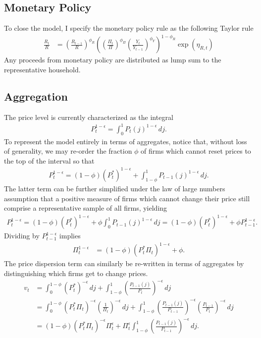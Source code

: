 \documentclass[12 pt, oneside]{article}
\theoremstyle{definition}
\theoremstyle{definition}
\theoremstyle{definition}
\begin{document}
\subsection{Monetary Policy}
To close the model, I specify the monetary policy rule as the following Taylor rule
\begin{align}\label{eq:taylor rule}
  \frac{R_t}{R} & =  \left(\frac{R_{t - 1}}{R}\right)^{\phi_R}\left(\left(\frac{\Pi_t}{\Pi}\right)^{\phi_\Pi}\left(\frac{Y_t}{Y_{t - 1}}\right)^{\phi_Y}\right)^{1 - \phi_R}\exp(\eta_{R, t})
\end{align}
Any proceeds from monetary policy are distributed as lump sum to the representative household.

\subsection{Aggregation}
The price level is currently characterized as the integral
\begin{align*}
  P_t^{1 - \epsilon} = \int_0^1 P_t(j)^{1 - \epsilon}\, dj.
\end{align*}
To represent the model entirely in terms of aggregates, notice that, without loss of generality, we may re-order the fraction $\phi$ of firms which cannot reset prices to the top of the interval so that
\begin{align*}
  P_t^{1 - \epsilon} = (1 - \phi)(P_t^*)^{1 - \epsilon} +  \int_{1 - \phi}^1 P_{t - 1}(j)^{1 - \epsilon}\, dj.
\end{align*}
The latter term can be further simplified under the law of large numbers assumption that a positive measure of firms which cannot change their price
still comprise a representative sample of all firms, yielding
\begin{align*}
  P_t^{1 - \epsilon} = (1 - \phi)(P_t^*)^{1 - \epsilon} +  \phi\int_0^1 P_{t - 1}(j)^{1 - \epsilon}\, dj = (1 - \phi)(P_t^*)^{1 - \epsilon} +  \phi P_{t - 1}^{1 - \epsilon}.
\end{align*}
Dividing by $P_{t - 1}^{1 - \epsilon}$ implies
\begin{align}\label{eq:inflation from optimal reset price}
  \Pi_t^{ 1 - \epsilon} & = (1 - \phi) (P_t^*\Pi_t)^{1 - \epsilon} + \phi.
\end{align}
The price dispersion term can similarly be re-written in terms of aggregates by distinguishing which firms get to change prices.
\begin{align*}
  v_t & = \int_0^{1 - \phi}\left(P_t^*\right)^{ - \epsilon}\, dj + \int_{1 - \phi}^1 \left(\frac{P_{t - 1}(j)}{P_t}\right)^{ - \epsilon}\, dj\\
      & = \int_0^{1 - \phi}\left(P_t^*\Pi_t\right)^{ - \epsilon}\left(\frac{1}{\Pi_t}\right)^{ - \epsilon}\, dj + \int_{1 - \phi}^1 \left(\frac{P_{t - 1}(j)}{P_{t - 1}}\right)^{ - \epsilon}\left(\frac{P_{t - 1}}{P_t}\right)^{ - \epsilon}\, dj\\
      & = (1 - \phi) (P_t^*\Pi_t)^{-\epsilon} \Pi_t^{\epsilon}  + \Pi_t^{\epsilon} \int_{1 - \phi}^1 \left(\frac{P_{t - 1}(j)}{P_{t - 1}}\right)^{ - \epsilon}\,dj.
\end{align*}
\end{document}
